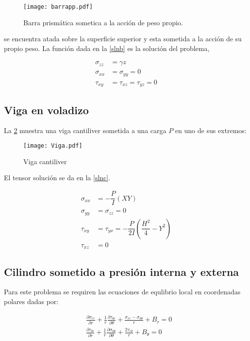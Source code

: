 \documentclass[../notas medios.tex]{subfiles}
\begin{document}
\begin{figure}[H]
\centering
	\texttt{[image: barrapp.pdf]}
	\caption{Barra prismática sometica a la acción de peso propio.}
	\label{barra}
\end{figure}

se encuentra atada sobre la superficie superior y esta sometida a la acción de su propio peso. La función dada en la \cref{slnb} es la solución del problema,


\begin{equation}
\begin{split}
{\sigma _{zz}} & = \gamma z \\
{\sigma _{xx}} & = {\sigma _{yy}} = 0 \\
{\tau _{xy}}   & = {\tau _{xz}} = {\tau _{yz}} = 0
\end{split}
\label{slnb}
\end{equation}


\subsection*{Viga en voladizo}

La \cref{Viga} muestra una viga cantiliver sometida a una carga $P$ en uno de sus extremos: 
\begin{figure}[H]
\centering
	\texttt{[image: Viga.pdf]}
	\caption{Viga cantiliver}
	\label{Viga}
\end{figure}

El tensor solución se da en la \cref{slnc}.

\begin{equation}
\begin{split}
{\sigma_{xx}} & = - \dfrac{P}{I} (XY) \\
 {\sigma_{yy} }&= \sigma_{zz} = 0 \\
{\tau_{xy}} & = \tau_{yx} = - \dfrac{P}{2I} (\dfrac{H^2}{4} - Y^2) \\ 
{\tau_{xz}} &= 0
\end{split}	
\label{viga}
\end{equation}


\subsection*{Cilindro sometido a presión interna y externa}
Para este problema se requiren las ecuaciones de equlibrio local en coordenadas polares dadas por:

\begin{equation} \label{equcil}
\begin{split}
& \frac{{\partial {\sigma _{rr}}}}{{\partial r}} + \frac{1}{r}\frac{{\partial {\tau _{\theta r}}}}{{\partial \theta }} + \frac{{{\sigma _{rr}} - {\sigma _{\theta \theta }}}}{r} + {B_r} = 0 \\
& \frac{{\partial {\tau _{\theta r}}}}{{\partial r}} + \frac{1}{r}\frac{{\partial {\sigma _{\theta \theta }}}}{{\partial \theta }} + \frac{{2{\tau _{r\theta }}}}{r} + {B_\theta } = 0
\end{split}
\end{equation}
\end{document}
